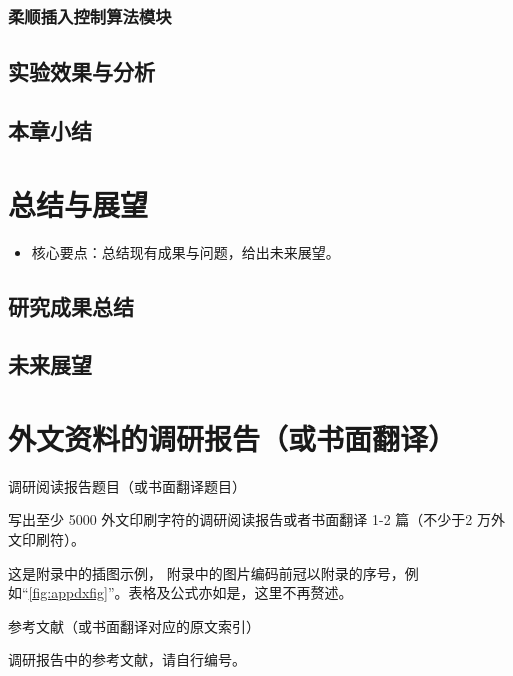 \documentclass{Diploma}
\begin{document}
\subsection{柔顺插入控制算法模块}
\section{实验效果与分析}
\section{本章小结}

\chapter{总结与展望}
\begin{itemize}
  \item 核心要点：总结现有成果与问题，给出未来展望。
\end{itemize}
\section{研究成果总结}
\section{未来展望}


\StartAppendix%
\chapter{外文资料的调研报告（或书面翻译）}
\begin{center}
调研阅读报告题目（或书面翻译题目）
\end{center}

写出至少 5000 外文印刷字符的调研阅读报告或者书面翻译 1-2 篇（不少于2 万外文印刷符）。

这是附录中的插图示例，
%
附录中的图片编码前冠以附录的序号，例如“\ref{fig:appdxfig}”。表格及公式亦如是，这里不再赘述。

\begin{center}
参考文献（或书面翻译对应的原文索引）
\end{center}
\begin{reflist}
  \item 调研报告中的参考文献，请自行编号。
\end{reflist}
\end{document}
